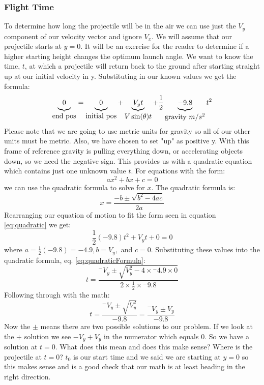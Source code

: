 \documentclass[10pt,a4paper]{article}
\begin{document}
	\subsubsection{Flight Time}
		To determine how long the projectile will be in the air we can use just the $V_y$ component of our velocity vector and ignore $V_x$.
		We will assume that our projectile starts at $y=0$.
		It will be an exercise for the reader to determine if a higher starting height changes the optimum launch angle.
		We want to know the time, $t$, at which a projectile will return back to the ground after starting straight up at our initial velocity in y.
		Substituting in our known values we get the formula:
		\[\underbrace{0		\rule[-3pt]{0pt}{5pt}}_{\mbox{end pos}}
		  = \underbrace{0 		\rule[-3pt]{0pt}{5pt}}_{\mbox{initial pos}}
		  + \underbrace{V_yt	\rule[-3pt]{0pt}{5pt}}_{\mbox{$V\sin(\theta)t$}}
		  + \frac{1}{2}
		  \underbrace{-9.8		\rule[-3pt]{0pt}{5pt}}_{\mbox{gravity $m/s^2$}}
		  t^2  \]
		Please note that we are going to use metric units for gravity so all of our other units must be metric.
		Also, we have chosen to set "up" as positive y. 
		With this frame of reference gravity is pulling everything down, or accelerating objects down, so we need the negative sign. 
		This provides us with a quadratic equation which contains just one unknown value $t$.
		For equations with the form:
		\begin{equation}
			ax^2 + bx + c = 0
			\label{eq:quadratic}
		\end{equation}
		we can use the quadratic formula to solve for $x$.
		The quadratic formula is:
		\begin{equation}
			x = \frac{-b \pm \sqrt{b^2 - 4ac} }{2a}
			\label{eq:quadraticFormula}
		\end{equation}
		Rearranging our equation of motion to fit the form seen in equation \ref{eq:quadratic} we get:
		\[ \frac{1}{2}(-9.8)t^2 + V_yt + 0 = 0 \]
		where $a = \frac{1}{2}(-9.8) = -4.9, b = V_y,$ and $c = 0$.
		Substituting these values into the quadratic formula, eq. \ref{eq:quadraticFormula}:
		\[
			t = \frac{^- V_y \pm \sqrt{V_y^2 - 4 \times {^- 4.9} \times 0}}{2 \times \frac{1}{2} \times {^- 9.8}}
		\]
		Following through with the math:
		\[
			t = \frac{^- V_y \pm \sqrt{V_y^2}}{-9.8} = \frac{^- V_y \pm V_y}{-9.8}
		\]
		Now the $\pm$ means there are two possible solutions to our problem.
		If we look at the $+$ solution we see $-V_y + V_y$ in the numerator which equals 0.
		So we have a solution at $t=0$.
		What does this mean and does this make sense?
		Where is the projectile at $t=0$?
		$t_0$ is our start time and we said we are starting at $y=0$ so this makes sense and is a good check that our math is at least heading in the right direction.
		
\end{document}

